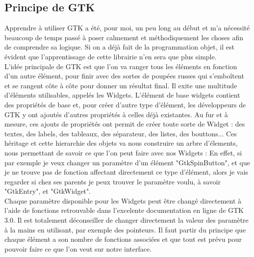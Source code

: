 \documentclass[11pt,french,a4paper]{report}
\begin{document}
        \subsection{Principe de GTK}
Apprendre à utiliser GTK a été, pour moi, un peu long au début et m'a nécessité beaucoup de temps passé à poser calmement et méthodiquement les choses afin de 
comprendre sa logique. Si on a déjà fait de la programmation objet, il est évident que l'apprentissage de cette librairie n'en sera que plus simple. \\
L'idée principale de GTK est que l'on va ranger tous les éléments en fonction d'un autre élément, pour finir avec des sortes de poupées russes qui s'emboîtent 
et se rangent côte à côte pour donner un résultat final. Il exite une multitude d'éléments utilisables, appelés les Widgets. L'élément de base widgets contient des propriétés de 
base et, pour créer d'autre type d'élément, les développeurs de GTK y ont ajoutés d'autres propriétés à celles déjà existantes. 
Au fur et à mesure, ces ajouts de propriétés ont permit de créer toute sorte de Widget : des textes, des labels, des tableaux, des séparateur, des listes, des bouttons... 
Ces héritage et cette hierarchie des objets va nous construire un arbre d'élements, nous permettant de savoir ce que l'on peut faire avec nos Widgets : 
En effet, si par exemple je veux changer un paramètre d'un élément "GtkSpinButton", et que je ne trouve pas de fonction affectant directement ce type d'élément, 
alors je vais regarder si chez ses parents je peux trouver le paramètre voulu, à savoir "GtkEntry", et "GtkWidget". \\

Chaque paramètre disponible pour les Widgets peut être changé directement à l'aide de fonctions retrouvable dans l'excelente documentation en ligne de GTK 3.0. 
Il est totalement déconseiller de changer directement la valeur des paramètre à la mains en utilisant, par exemple des pointeurs. Il faut partir du principe que 
chaque élément a son nombre de fonctions associées et que tout est prévu pour pouvoir faire ce que l'on veut sur notre interface. \\ 
\\
\end{document}
